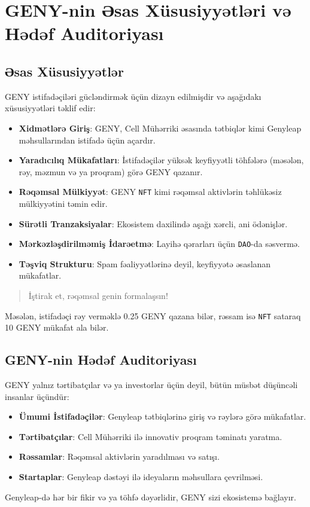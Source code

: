 \documentclass[a4paper,12pt,openany]{book}
\begin{document}
\section*{GENY-nin Əsas Xüsusiyyətləri və Hədəf Auditoriyası}
\subsection*{Əsas Xüsusiyyətlər}
GENY istifadəçiləri gücləndirmək üçün dizayn edilmişdir və aşağıdakı xüsusiyyətləri təklif edir:
\begin{itemize}
    \item \textbf{Xidmətlərə Giriş}: GENY, Cell Mühərriki əsasında tətbiqlər kimi Genyleap məhsullarından istifadə üçün açardır.
    \item \textbf{Yaradıcılıq Mükafatları}: İstifadəçilər yüksək keyfiyyətli töhfələrə (məsələn, rəy, məzmun və ya proqram) görə GENY qazanır.
    \item \textbf{Rəqəmsal Mülkiyyət}: GENY \texttt{NFT} kimi rəqəmsal aktivlərin təhlükəsiz mülkiyyətini təmin edir.
    \item \textbf{Sürətli Tranzaksiyalar}: Ekosistem daxilində aşağı xərcli, ani ödənişlər.
    \item \textbf{Mərkəzləşdirilməmiş İdarəetmə}: Layihə qərarları üçün \texttt{DAO}-da səsvermə.
    \item \textbf{Təşviq Strukturu}: Spam fəaliyyətlərinə deyil, keyfiyyətə əsaslanan mükafatlar.
\end{itemize}
\begin{quote}
İştirak et, rəqəmsal genin formalaşsın!
\end{quote}
Məsələn, istifadəçi rəy verməklə 0.25 GENY qazana bilər, rəssam isə \texttt{NFT} sataraq 10 GENY mükafat ala bilər.

\subsection*{GENY-nin Hədəf Auditoriyası}
GENY yalnız tərtibatçılar və ya investorlar üçün deyil, bütün müsbət düşüncəli insanlar üçündür:
\begin{itemize}
    \item \textbf{Ümumi İstifadəçilər}: Genyleap tətbiqlərinə giriş və rəylərə görə mükafatlar.
    \item \textbf{Tərtibatçılar}: Cell Mühərriki ilə innovativ proqram təminatı yaratma.
    \item \textbf{Rəssamlar}: Rəqəmsal aktivlərin yaradılması və satışı.
    \item \textbf{Startaplar}: Genyleap dəstəyi ilə ideyaların məhsullara çevrilməsi.
\end{itemize}
Genyleap-də hər bir fikir və ya töhfə dəyərlidir, GENY sizi ekosistemə bağlayır.
\newpage
\end{document}
